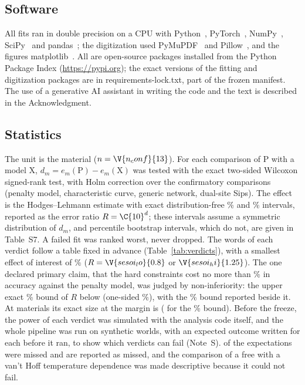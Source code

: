 \documentclass[journal=jcisd8,manuscript=article]{achemso}
\begin{document}
\subsection*{Software}

All fits ran in double precision on a CPU with Python~, PyTorch~\cite{paszke2019},
NumPy~\cite{harris2020}, SciPy~\cite{virtanen2020} and
pandas~\cite{mckinney2010}; the digitization used PyMuPDF~ and
Pillow~, and the figures matplotlib~\cite{hunter2007}. All are open-source packages
installed from the Python Package Index (\url{https://pypi.org}); the exact versions of the fitting and digitization packages are in requirements-lock.txt,
part of the frozen manifest. The use of a generative AI assistant in writing the code and the text is described in
the Acknowledgment.

\subsection*{Statistics}

The unit is the material ($n = \V{n_conf}{13}$). For each comparison of P with a model X,
$d_m = e_m(\mathrm{P}) - e_m(\mathrm{X})$ was tested with the exact two-sided Wilcoxon signed-rank test, with Holm
correction over the  confirmatory comparisons (penalty model, characteristic curve, generic
network, dual-site Sips). The effect is the Hodges--Lehmann estimate with exact distribution-free
\% and \% intervals, reported as the error ratio $R = \C{10}^{d}$; these intervals assume a
symmetric distribution of $d_m$, and percentile bootstrap intervals, which do not, are given in
Table~S7. A failed fit was ranked worst, never dropped. The words of each verdict follow a table fixed in advance
(Table~\ref{tab:verdicts}), with a smallest effect of
interest of \% ($R = \V{sesoi_lo}{0.8}$ or $\V{sesoi_hi}{1.25}$). The one declared primary claim,
that the hard constraints cost no more than \% in accuracy against the penalty model, was judged
by non-inferiority: the upper exact \% bound of $R$ below  (one-sided
\%), with the \% bound reported beside it. At  materials its exact
size at the margin is  ( for the \% bound). Before the
freeze, the power of each verdict was simulated with the analysis code itself, and the whole pipeline was run on
 synthetic worlds, with an expected outcome written for each before it ran, to show which
verdicts can fail (Note~S).  of the expectations were missed and are
reported as missed, and the comparison of a free with a van't Hoff temperature dependence was made descriptive
because it could not fail.
\end{document}
